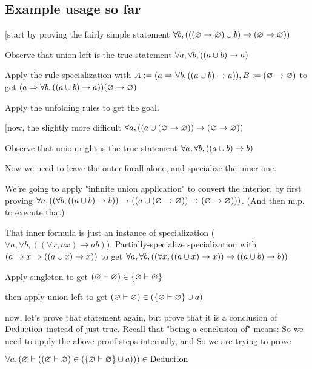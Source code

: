\documentclass{article}
\begin{document}
  \subsection{Example usage so far}
  
  [start by proving the fairly simple statement $\forall b, (((\varnothing \to \varnothing) \cup b) \to (\varnothing \to \varnothing))$

  Observe that union-left is the true statement $\forall a, \forall b, ((a \cup b) \to a)$

  Apply the rule specialization with $A := (a \Rightarrow \forall b, ((a \cup b) \to a)), B := (\varnothing \to \varnothing)$ to get $(a \Rightarrow \forall b, ((a \cup b) \to a))(\varnothing \to \varnothing)$

  Apply the unfolding rules to get the goal.

  [now, the slightly more difficult $\forall a, ((a \cup (\varnothing \to \varnothing)) \to (\varnothing \to \varnothing))$

  Observe that union-right is the true statement $\forall a, \forall b, ((a \cup b) \to b)$

  Now we need to leave the outer forall alone, and specialize the inner one.

  We're going to apply "infinite union application" to convert the interior, by first proving $\forall a, ((\forall b, ((a \cup b) \to b)) \to ((a \cup (\varnothing \to \varnothing)) \to (\varnothing \to \varnothing)))$. (And then m.p. to execute that)

  That inner formula is just an instance of specialization ($\forall a, \forall b, ((\forall x, ax) \to ab)$). Partially-specialize specialization with $(a \Rightarrow x \Rightarrow ((a \cup x) \to x))$ to get $\forall a, \forall b, ((\forall x, ((a \cup x) \to x)) \to ((a \cup b) \to b))$


  
  Apply singleton to get $(\varnothing \vdash \varnothing) \in \{\varnothing \vdash \varnothing\}$
  
  then apply union-left to get $(\varnothing \vdash \varnothing) \in (\{\varnothing \vdash \varnothing\} \cup a)$
  
  now, let's prove that statement again, but prove that it is a conclusion of $\operatorname{\mathrm{Deduction}} $ instead of just true. Recall that "being a conclusion of" means: So we need to apply the above proof steps internally, and So we are trying to prove
  
  $\forall a, (\varnothing \vdash ((\varnothing \vdash \varnothing) \in (\{\varnothing \vdash \varnothing\} \cup a))) \in \operatorname{\mathrm{Deduction}}$
  
\end{document}
